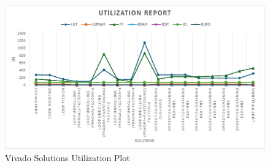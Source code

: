 \begin{figure}[H]
	\centering
	\includegraphics[width=0.7\textheight]{conclusions/utilization.png}
	\caption{Vivado Solutions Utilization Plot}
	\label{fig:vivado-solutions-utilization-plot}
\end{figure}



